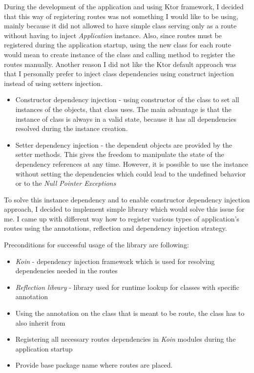 During the development of the application and using Ktor framework, 
I decided that this way of registering routes was not something I would like to be using,
mainly because it did not allowed to have simple class serving only as a route without having to inject \textit{Application} instance.
Also, 
since routes must be registered during the application startup,
using the new class for each route would mean to create instance of the class and calling method to register the routes manually.
Another reason I did not like the Ktor default approach was 
that I personally prefer to inject class dependencies using construct injection instead of using setters injection.
\begin{itemize}
	\item Constructor dependency injection - using constructor of the class to set all instances of the objects, that class uses.
	      The main advantage is that the instance of class is always in a valid state, because it has all dependencies resolved during the instance creation.
	\item Setter dependency injection - the dependent objects are provided by the setter methods.
	      This gives the freedom to manipulate the state of the dependency references at any time.
	      However, it is possible to use the instance without setting the dependencies which could lead to the undefined behavior or to the \textit{Null Pointer Exceptions}
\end{itemize}

To solve this  instance dependency and to enable constructor dependency injection approach,
I decided to implement simple library which would solve this issue for me.
I came up with different way how to register various types of application's routes using the annotations, 
reflection and dependency injection strategy.

\medskip \noindent
Preconditions for successful usage of the library are following:
\begin{itemize}
	\item \textit{Koin}\cite{koinGithub} - dependency injection framework which is used for resolving dependencies needed in the routes
	\item \textit{Reflection library}\cite{reflectionsGithub} - library used for runtime lookup for classes with specific annotation
	\item Using the  annotation on the class that is meant to be route,
	the class has to also inherit from 
	\item Registering all necessary routes dependencies in \textit{Koin} modules during the application startup
	\item Provide base package name where routes are placed.
\end{itemize}

